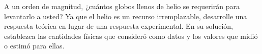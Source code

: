 \item A un orden de magnitud, ¿cuántos globos llenos de helio se requerirán para levantarlo a usted? Ya que el helio es un recurso irremplazable, desarrolle una respuesta teórica en lugar de una respuesta experimental. En su solución, establezca las cantidades físicas que consideró como datos y los valores que midió o estimó para ellas.
